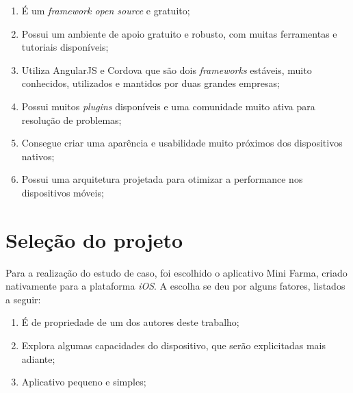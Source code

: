\begin{enumerate}
    \item É um \textit{framework open source} e gratuito;
    \item Possui um ambiente de apoio gratuito e robusto, com muitas ferramentas e tutoriais disponíveis;
    \item Utiliza AngularJS e Cordova que são dois \textit{frameworks} estáveis, muito conhecidos, utilizados e mantidos por duas grandes empresas;
    \item Possui muitos \textit{plugins} disponíveis e uma comunidade muito ativa para resolução de problemas; %
    \item Consegue criar uma aparência e usabilidade muito próximos dos dispositivos nativos; %
    \item Possui uma arquitetura projetada para otimizar a performance nos dispositivos móveis; 
\end{enumerate}

\section{Seleção do projeto} \label{sec:selecaodoprojeto}

Para a realização do estudo de caso, foi escolhido o aplicativo Mini Farma, criado nativamente para a plataforma \textit{iOS}. A escolha se deu por alguns fatores, listados a seguir:

\begin{enumerate}
    \item É de propriedade de um dos autores deste trabalho;
    \item Explora algumas capacidades do dispositivo, que serão explicitadas mais adiante;
    \item Aplicativo pequeno e simples;
\end{enumerate}
 